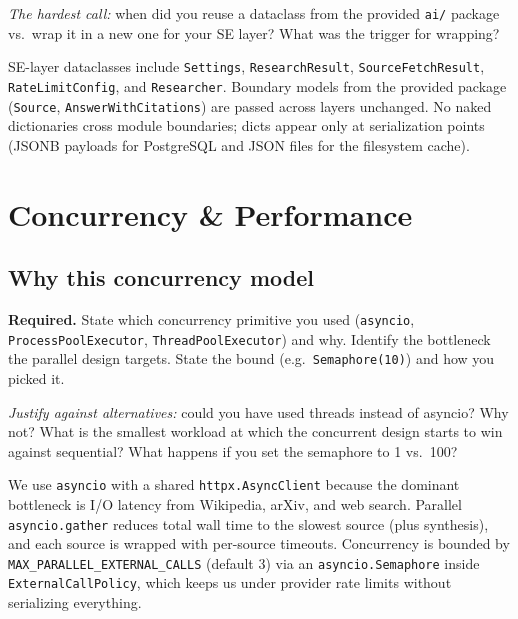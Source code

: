 \documentclass[11pt,a4paper]{article}
\begin{document}
\begin{probebox}
\textit{The hardest call:} when did you reuse a dataclass from the provided \texttt{ai/} package vs.\ wrap it in a new one for your SE layer? What was the trigger for wrapping?
\end{probebox}

SE-layer dataclasses include \texttt{Settings}, \texttt{ResearchResult}, \texttt{SourceFetchResult}, \texttt{RateLimitConfig}, and \texttt{Researcher}. Boundary models from the provided package (\texttt{Source}, \texttt{AnswerWithCitations}) are passed across layers unchanged. No naked dictionaries cross module boundaries; dicts appear only at serialization points (JSONB payloads for PostgreSQL and JSON files for the filesystem cache).

\section{Concurrency \& Performance}\label{sec:concurrency}

\subsection{Why this concurrency model}

\begin{deliverbox}
\textbf{Required.} State which concurrency primitive you used (\texttt{asyncio}, \texttt{ProcessPoolExecutor}, \texttt{ThreadPoolExecutor}) and why. Identify the bottleneck the parallel design targets. State the bound (e.g.\ \texttt{Semaphore(10)}) and how you picked it.
\end{deliverbox}

\begin{probebox}
\textit{Justify against alternatives:} could you have used threads instead of asyncio? Why not? What is the smallest workload at which the concurrent design starts to win against sequential? What happens if you set the semaphore to 1 vs.\ 100?
\end{probebox}

We use \texttt{asyncio} with a shared \texttt{httpx.AsyncClient} because the dominant bottleneck is I/O latency from Wikipedia, arXiv, and web search. Parallel \texttt{asyncio.gather} reduces total wall time to the slowest source (plus synthesis), and each source is wrapped with per-source timeouts. Concurrency is bounded by \texttt{MAX\_PARALLEL\_EXTERNAL\_CALLS} (default 3) via an \texttt{asyncio.Semaphore} inside \texttt{ExternalCallPolicy}, which keeps us under provider rate limits without serializing everything.
\end{document}
